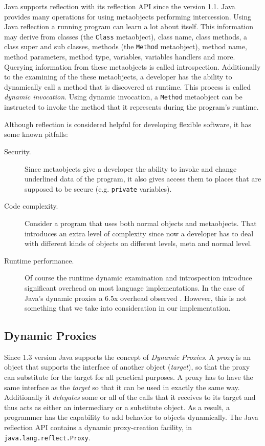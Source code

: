 Java supports reflection with its reflection API since the version 1.1.
Java provides many operations for using metaobjects performing intercession.
Using Java reflection a running program can learn a lot about itself. 
This information may derive from classes (the \texttt{Class} metaobject), class name, class methods, a class super and sub classes, methods (the \texttt{Method} metaobject), method name, method parameters, method type, variables, variables handlers and more. 
Querying information from these metaobjects is called introspection.
Additionally to the examining of the these metaobjects, a developer has the ability to dynamically call a method that is discovered at runtime. 
This process is called \textit{dynamic invocation}. 
Using dynamic invocation, a \texttt{Method} metaobject can be instructed to invoke the method that it represents during the program's runtime. 

Although reflection is considered helpful for developing flexible software, it has some known pitfalls:

\begin{description}
	
	\item[Security.] Since metaobjects give a developer the ability to invoke and change underlined data of the program, it also gives access them to places that are supposed to be secure (e.g. \texttt{private} variables).

	\item[Code complexity.] Consider a program that uses both normal objects and metaobjects. 
	That introduces an extra level of complexity since now a developer has to deal with different kinds of objects on different levels, meta and normal level.

	\item[Runtime performance.] Of course the runtime dynamic examination and introspection introduce significant overhead on most language implementations. 
	In the case of Java's dynamic proxies a 6.5x overhead observed \cite{marr2015zero}. 
	However, this is not something that we take into consideration in our implementation.

\end{description}

\subsection{Dynamic Proxies}\label{Dynamic Proxies}
Since 1.3 version Java supports the concept of \textit{Dynamic Proxies}.
A \textit{proxy} is an object that supports the interface of another object (\textit{target}), so that the proxy can substitute for the target for all practical purposes\cite{forman2004java}.
A proxy has to have the same interface as the \textit{target} so that it can be used in exactly the same way. 
Additionally it \textit{delegates} some or all of the calls that it receives to its target and thus acts as either an intermediary or a substitute object.
As a result, a programmer has the capability to add behavior to objects dynamically. 
The Java reflection API contains a dynamic proxy-creation facility, in \texttt{java.lang.reflect.Proxy}.

